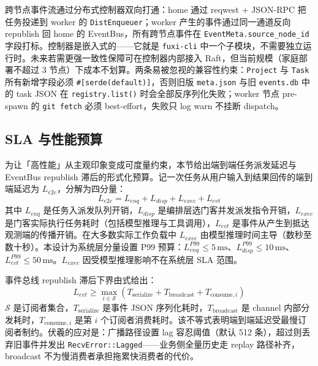跨节点事件流通过分布式控制器双向打通：home 通过 reqwest + JSON-RPC 把任务投递到 worker 的 \texttt{DistEnqueuer}；worker 产生的事件通过同一通道反向 republish 回 home 的 EventBus，所有跨节点事件在 \texttt{EventMeta.source\_node\_id} 字段打标。控制器是嵌入式的——它就是 \texttt{fuxi-cli} 中一个子模块，不需要独立运行时。未来若需更强一致性保障可在控制器内部接入 Raft\parencite{ongaro2014raft}，但当前规模（家庭部署不超过 3 节点）下成本不划算。两条易被忽视的兼容性约束：\texttt{Project} 与 \texttt{Task} 所有新增字段必须 \texttt{\#[serde(default)]}，否则旧版 \texttt{meta.json} 与旧 \texttt{events.db} 中的 task JSON 在 \texttt{registry.list()} 时会全部反序列化失败；worker 节点 pre-spawn 的 \texttt{git fetch} 必须 best-effort，失败只 log warn 不挂断 dispatch。

\subsection{SLA 与性能预算}
\label{subsec:sla}

为让「高性能」从主观印象变成可度量约束，本节给出端到端任务派发延迟与 EventBus republish 滞后的形式化预算。记一次任务从用户输入到结果回传的端到端延迟为 $L_{e2e}$，分解为四分量：
\begin{equation}
L_{e2e} = L_{enq} + L_{disp} + L_{exec} + L_{evt}
\end{equation}
其中 $L_{enq}$ 是任务入派发队列开销，$L_{disp}$ 是编排层选门客并发派发指令开销，$L_{exec}$ 是门客实际执行任务耗时（包括模型推理与工具调用），$L_{evt}$ 是事件从产生到抵达观测端的传播开销。在大多数实际工作负载中 $L_{exec}$ 由模型推理时间主导（数秒至数十秒）。本设计为系统层分量设置 P99 预算：$L_{enq}^{P99} \le 5\,\text{ms}$、$L_{disp}^{P99} \le 10\,\text{ms}$、$L_{evt}^{P99} \le 50\,\text{ms}$。$L_{exec}$ 因受模型推理影响不在系统层 SLA 范围。

事件总线 republish 滞后下界由式给出：
\begin{equation}
L_{evt} \geq \max_{i \in \mathcal{S}} \left( T_{\text{serialize}} + T_{\text{broadcast}} + T_{\text{consume},i} \right)
\end{equation}
$\mathcal{S}$ 是订阅者集合，$T_{\text{serialize}}$ 是事件 JSON 序列化耗时，$T_{\text{broadcast}}$ 是 channel 内部分发耗时，$T_{\text{consume},i}$ 是第 $i$ 个订阅者消费耗时\parencite{lamport1978time}。该不等式表明端到端延迟受最慢订阅者制约。伏羲的应对是：广播路径设置 lag 容忍阈值（默认 512 条），超过则丢弃旧事件并发出 \texttt{RecvError::Lagged}——业务侧全量历史走 replay 路径补齐，broadcast 不为慢消费者承担拖累快消费者的代价。

